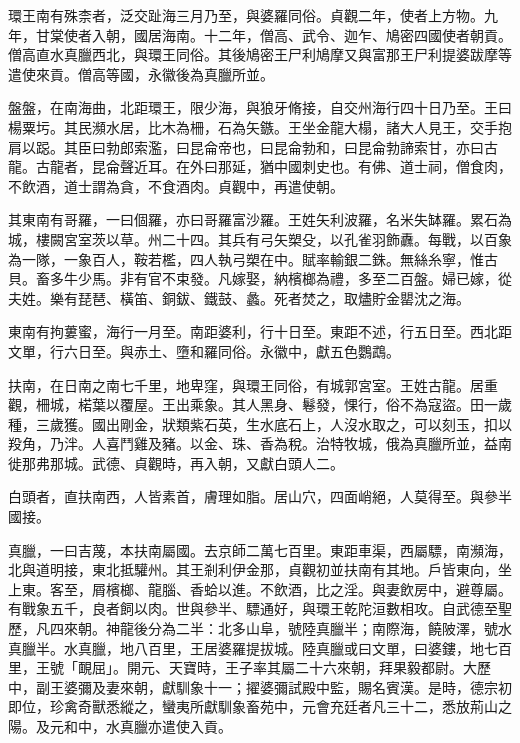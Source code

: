 \begin{pinyinscope}
 環王南有殊柰者，泛交趾海三月乃至，與婆羅同俗。貞觀二年，使者上方物。九年，甘棠使者入朝，國居海南。十二年，僧高、武令、迦乍、鳩密四國使者朝貢。僧高直水真臘西北，與環王同俗。其後鳩密王尸利鳩摩又與富那王尸利提婆跋摩等遣使來貢。僧高等國，永徽後為真臘所並。



 盤盤，在南海曲，北距環王，限少海，與狼牙脩接，自交州海行四十日乃至。王曰楊粟圬。其民瀕水居，比木為柵，石為矢鏃。王坐金龍大榻，諸大人見王，交手抱肩以跽。其臣曰勃郎索濫，曰昆侖帝也，曰昆侖勃和，曰昆侖勃諦索甘，亦曰古龍。古龍者，昆侖聲近耳。在外曰那延，猶中國刺史也。有佛、道士祠，僧食肉，不飲酒，道士謂為貪，不食酒肉。貞觀中，再遣使朝。



 其東南有哥羅，一曰個羅，亦曰哥羅富沙羅。王姓矢利波羅，名米失缽羅。累石為城，樓闕宮室茨以草。州二十四。其兵有弓矢槊殳，以孔雀羽飾纛。每戰，以百象為一隊，一象百人，鞍若檻，四人執弓槊在中。賦率輸銀二銖。無絲糸寧，惟古貝。畜多牛少馬。非有官不束發。凡嫁娶，納檳榔為禮，多至二百盤。婦已嫁，從夫姓。樂有琵琶、橫笛、銅鈸、鐵鼓、蠡。死者焚之，取燼貯金罌沈之海。



 東南有拘蔞蜜，海行一月至。南距婆利，行十日至。東距不述，行五日至。西北距文單，行六日至。與赤土、墮和羅同俗。永徽中，獻五色鸚鵡。



 扶南，在日南之南七千里，地卑窪，與環王同俗，有城郭宮室。王姓古龍。居重觀，柵城，楉葉以覆屋。王出乘象。其人黑身、鬈發，惈行，俗不為寇盜。田一歲種，三歲獲。國出剛金，狀類紫石英，生水底石上，人沒水取之，可以刻玉，扣以羖角，乃泮。人喜鬥雞及豬。以金、珠、香為稅。治特牧城，俄為真臘所並，益南徙那弗那城。武德、貞觀時，再入朝，又獻白頭人二。



 白頭者，直扶南西，人皆素首，膚理如脂。居山穴，四面峭絕，人莫得至。與參半國接。



 真臘，一曰吉蔑，本扶南屬國。去京師二萬七百里。東距車渠，西屬驃，南瀕海，北與道明接，東北抵驩州。其王剎利伊金那，貞觀初並扶南有其地。戶皆東向，坐上東。客至，屑檳榔、龍腦、香蛤以進。不飲酒，比之淫。與妻飲房中，避尊屬。有戰象五千，良者飼以肉。世與參半、驃通好，與環王乾陀洹數相攻。自武德至聖歷，凡四來朝。神龍後分為二半：北多山阜，號陸真臘半；南際海，饒陂澤，號水真臘半。水真臘，地八百里，王居婆羅提拔城。陸真臘或曰文單，曰婆鏤，地七百里，王號「靦屈」。開元、天寶時，王子率其屬二十六來朝，拜果毅都尉。大歷中，副王婆彌及妻來朝，獻馴象十一；擢婆彌試殿中監，賜名賓漢。是時，德宗初即位，珍禽奇獸悉縱之，蠻夷所獻馴象畜苑中，元會充廷者凡三十二，悉放荊山之陽。及元和中，水真臘亦遣使入貢。




\end{pinyinscope}
